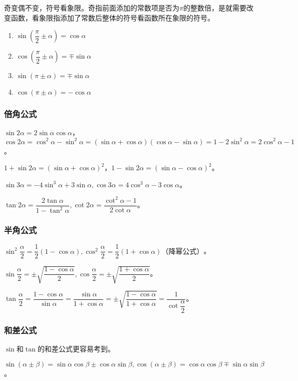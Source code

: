 \documentclass[UTF8, 12pt]{ctexart}
\begin{document}
奇变偶不变，符号看象限。奇指前面添加的常数项是否为$\pi$的整数倍，是就需要改变函数，看象限指添加了常数后整体的符号看函数所在象限的符号。

\begin{enumerate}
    \item $\sin(\dfrac{\pi}{2}\pm\alpha)=\cos\alpha$
    \item $\cos(\dfrac{\pi}{2}\pm\alpha)=\mp\sin\alpha$
    \item $\sin(\pi\pm\alpha)=\mp\sin\alpha$
    \item $\cos(\pi\pm\alpha)=-\cos\alpha$
\end{enumerate}

\subsubsection{倍角公式}

$\sin 2\alpha=2\sin\alpha\cos\alpha$，$\cos 2\alpha=\cos^2\alpha-\sin^2\alpha=(\sin\alpha+\cos\alpha)(\cos\alpha-\sin\alpha)=1-2\sin^2\alpha=2\cos^2\alpha-1$。

$1+\sin2\alpha=(\sin\alpha+\cos\alpha)^2$，$1-\sin2\alpha=(\sin\alpha-\cos\alpha)^2$。

$\sin 3\alpha=-4\sin^3\alpha+3\sin\alpha,\cos 3\alpha=4\cos^3\alpha-3\cos\alpha$。

$\tan 2\alpha=\dfrac{2\tan\alpha}{1-\tan^2\alpha},\cot 2\alpha=\dfrac{\cot^2\alpha-1}{2\cot\alpha}$。

\subsubsection{半角公式}

$\sin^2\dfrac{\alpha}{2}=\dfrac{1}{2}(1-\cos\alpha),\cos^2\dfrac{\alpha}{2}=\dfrac{1}{2}(1+\cos\alpha)\text{（降幂公式）}$。

$\sin\dfrac{\alpha}{2}=\pm\sqrt{\dfrac{1-\cos\alpha}{2}},\cos\dfrac{\alpha}{2}=\pm\sqrt{\dfrac{1+\cos\alpha}{2}}$。

$\tan\dfrac{\alpha}{2}=\dfrac{1-\cos\alpha}{\sin\alpha}=\dfrac{\sin\alpha}{1+\cos\alpha}=\pm\sqrt{\dfrac{1-\cos\alpha}{1+\cos\alpha}}=\dfrac{1}{\cot\dfrac{\alpha}{2}}$。

\subsubsection{和差公式}

$\sin$和$\tan$的和差公式更容易考到。

$\sin(\alpha\pm\beta)=\sin\alpha\cos\beta\pm\cos\alpha\sin\beta,\cos(\alpha\pm\beta)=\cos\alpha\cos\beta\mp\sin\alpha\sin\beta$。
\end{document}
